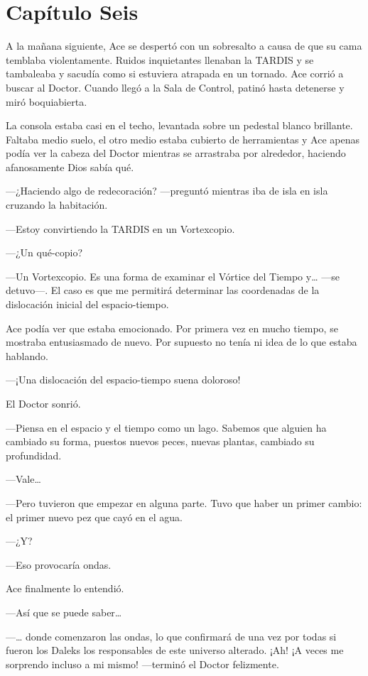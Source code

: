 \chapter*{Capítulo Seis}

A la mañana siguiente, Ace se despertó con un sobresalto a causa
de que su cama temblaba violentamente. Ruidos inquietantes llenaban la
TARDIS y se tambaleaba y sacudía como si estuviera atrapada en un
tornado. Ace corrió a buscar al Doctor. Cuando llegó a la Sala de
Control, patinó hasta detenerse y miró boquiabierta.

La consola estaba casi en el techo, levantada sobre un pedestal
blanco brillante. Faltaba medio suelo, el otro medio estaba cubierto de
herramientas y Ace apenas podía ver la cabeza del Doctor mientras se
arrastraba por alrededor, haciendo afanosamente Dios
sabía qué.

---¿Haciendo algo de redecoración? ---preguntó mientras iba de
isla en isla cruzando la habitación.

---Estoy convirtiendo la TARDIS en un Vortexcopio.

---¿Un qué-copio?

---Un Vortexcopio. Es una forma de examinar el Vórtice del
Tiempo y\ldots{} ---se detuvo---. El caso es que me permitirá determinar
las coordenadas de la dislocación inicial del espacio-tiempo.

Ace podía ver que estaba emocionado. Por primera vez en mucho
tiempo, se mostraba entusiasmado de nuevo. Por supuesto no tenía ni idea
de lo que estaba hablando.

---¡Una dislocación del espacio-tiempo suena doloroso!

El Doctor sonrió.

---Piensa en el espacio y el tiempo como un lago. Sabemos que alguien ha
cambiado su forma, puestos nuevos peces, nuevas plantas, cambiado su
profundidad.

---Vale\ldots{}

---Pero tuvieron que empezar en alguna parte. Tuvo que haber un
primer cambio: el primer nuevo pez que cayó en el agua.

---¿Y?

---Eso provocaría ondas.

Ace finalmente lo entendió.

---Así que se puede saber\ldots{}

---\ldots{} donde comenzaron las ondas, lo que confirmará de una
vez por todas si fueron los Daleks los responsables de este universo
alterado. ¡Ah! ¡A veces me sorprendo incluso a mi mismo! ---terminó el
Doctor felizmente.

